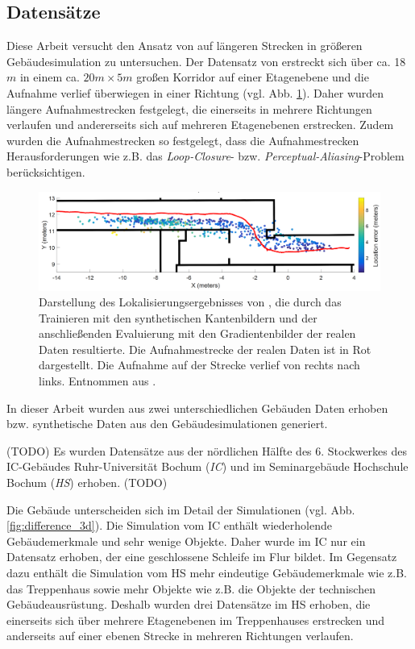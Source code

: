 \subsection{Datensätze}
\label{subsec:datasets}
Diese Arbeit versucht den Ansatz von \citet{acharyaBIMPoseNetIndoorCamera2019} auf längeren Strecken in größeren Gebäudesimulation zu untersuchen. Der Datensatz von \citet{acharyaBIMPoseNetIndoorCamera2019} erstreckt sich über ca. 18$m$ in einem ca. $20m \times 5m$ großen Korridor auf einer Etagenebene und die Aufnahme verlief überwiegen in einer Richtung (vgl. Abb. \ref{fig:acharya_traj}). Daher wurden längere Aufnahmestrecken festgelegt, die einerseits in mehrere Richtungen verlaufen und andererseits sich auf mehreren Etagenebenen erstrecken. Zudem wurden die Aufnahmestrecken so festgelegt, dass die Aufnahmestrecken Herausforderungen wie z.B. das \textit{Loop-Closure}- bzw. \textit{Perceptual-Aliasing}-Problem berücksichtigen.

\begin{figure}
	\centering
	\includegraphics[width=1.0\textwidth]{images/trajectories/acharya_traj.png}
	\caption{Darstellung des Lokalisierungsergebnisses von \citet{acharyaBIMPoseNetIndoorCamera2019}, die durch das Trainieren mit den synthetischen Kantenbildern und der anschließenden Evaluierung mit den Gradientenbilder der realen Daten resultierte. Die Aufnahmestrecke der realen Daten ist in Rot dargestellt. Die Aufnahme auf der Strecke verlief von rechts nach links. Entnommen aus \cite{acharyaBIMPoseNetIndoorCamera2019}.}
	\label{fig:acharya_traj}
\end{figure}



In dieser Arbeit wurden aus zwei unterschiedlichen Gebäuden Daten erhoben bzw. synthetische Daten aus den Gebäudesimulationen generiert. 

(TODO)
Es wurden Datensätze aus der nördlichen Hälfte des 6. Stockwerkes des IC-Gebäudes Ruhr-Universität Bochum (\textit{IC}) und im Seminargebäude Hochschule Bochum (\textit{HS}) erhoben. 
(TODO)

Die Gebäude unterscheiden sich im Detail der Simulationen (vgl.  Abb. \ref{fig:difference_3d}). Die Simulation vom IC enthält wiederholende Gebäudemerkmale und sehr wenige Objekte. Daher wurde im IC nur ein Datensatz erhoben, der eine geschlossene Schleife im Flur bildet. Im Gegensatz dazu enthält die Simulation vom HS mehr eindeutige Gebäudemerkmale wie z.B. das Treppenhaus sowie mehr Objekte wie z.B. die Objekte der technischen Gebäudeausrüstung. Deshalb wurden drei Datensätze im HS erhoben, die einerseits sich über mehrere Etagenebenen im Treppenhauses erstrecken und anderseits auf einer ebenen Strecke in mehreren Richtungen verlaufen.




